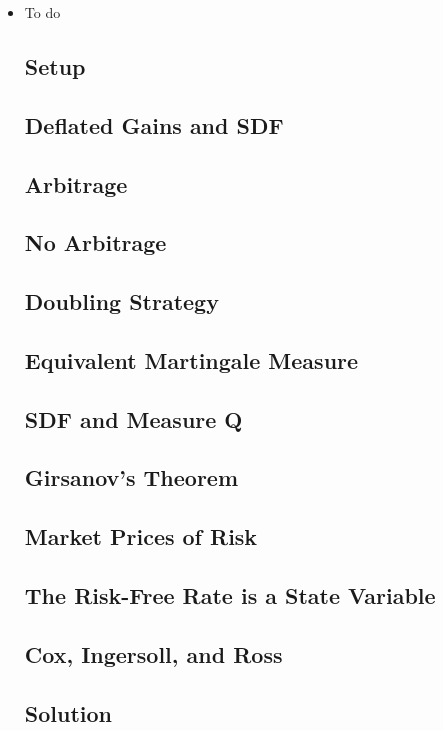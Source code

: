 \documentclass{article}
\begin{document}
\begin{itemize}

\item To do

\subsection*{Setup}

\subsection*{Deflated Gains and SDF}

\subsection*{Arbitrage}

\subsection*{No Arbitrage}

\subsection*{Doubling Strategy}

\subsection*{Equivalent Martingale Measure}

\subsection*{SDF and Measure Q}

\subsection*{Girsanov's Theorem}

\subsection*{Market Prices of Risk}

\subsection*{The Risk-Free Rate is a State Variable}

\subsection*{Cox, Ingersoll, and Ross}

\subsection*{Solution}

\end{itemize}
\end{document}
